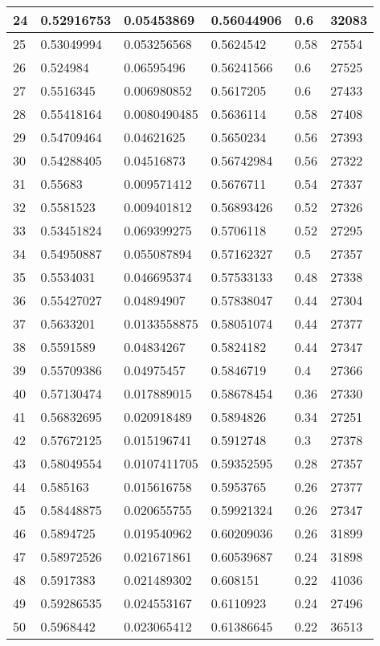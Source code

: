 \begin{longtable}{|l|l|l|l|l|l|}
24 & 0.52916753 & 0.05453869 & 0.56044906 & 0.6 & 32083 \\ \hline 
25 & 0.53049994 & 0.053256568 & 0.5624542 & 0.58 & 27554 \\ \hline 
26 & 0.524984 & 0.06595496 & 0.56241566 & 0.6 & 27525 \\ \hline 
27 & 0.5516345 & 0.006980852 & 0.5617205 & 0.6 & 27433 \\ \hline 
28 & 0.55418164 & 0.0080490485 & 0.5636114 & 0.58 & 27408 \\ \hline 
29 & 0.54709464 & 0.04621625 & 0.5650234 & 0.56 & 27393 \\ \hline 
30 & 0.54288405 & 0.04516873 & 0.56742984 & 0.56 & 27322 \\ \hline 
31 & 0.55683 & 0.009571412 & 0.5676711 & 0.54 & 27337 \\ \hline 
32 & 0.5581523 & 0.009401812 & 0.56893426 & 0.52 & 27326 \\ \hline 
33 & 0.53451824 & 0.069399275 & 0.5706118 & 0.52 & 27295 \\ \hline 
34 & 0.54950887 & 0.055087894 & 0.57162327 & 0.5 & 27357 \\ \hline 
35 & 0.5534031 & 0.046695374 & 0.57533133 & 0.48 & 27338 \\ \hline 
36 & 0.55427027 & 0.04894907 & 0.57838047 & 0.44 & 27304 \\ \hline 
37 & 0.5633201 & 0.0133558875 & 0.58051074 & 0.44 & 27377 \\ \hline 
38 & 0.5591589 & 0.04834267 & 0.5824182 & 0.44 & 27347 \\ \hline 
39 & 0.55709386 & 0.04975457 & 0.5846719 & 0.4 & 27366 \\ \hline 
40 & 0.57130474 & 0.017889015 & 0.58678454 & 0.36 & 27330 \\ \hline 
41 & 0.56832695 & 0.020918489 & 0.5894826 & 0.34 & 27251 \\ \hline 
42 & 0.57672125 & 0.015196741 & 0.5912748 & 0.3 & 27378 \\ \hline 
43 & 0.58049554 & 0.0107411705 & 0.59352595 & 0.28 & 27357 \\ \hline 
44 & 0.585163 & 0.015616758 & 0.5953765 & 0.26 & 27377 \\ \hline 
45 & 0.58448875 & 0.020655755 & 0.59921324 & 0.26 & 27347 \\ \hline 
46 & 0.5894725 & 0.019540962 & 0.60209036 & 0.26 & 31899 \\ \hline 
47 & 0.58972526 & 0.021671861 & 0.60539687 & 0.24 & 31898 \\ \hline 
48 & 0.5917383 & 0.021489302 & 0.608151 & 0.22 & 41036 \\ \hline 
49 & 0.59286535 & 0.024553167 & 0.6110923 & 0.24 & 27496 \\ \hline 
50 & 0.5968442 & 0.023065412 & 0.61386645 & 0.22 & 36513 \\ \hline 
\end{longtable}